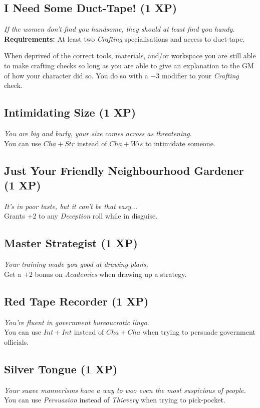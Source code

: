 \subsection*{I Need Some Duct-Tape! (1 XP)}
\textit{If the women don't find you handsome, they should at least find you handy.}\\
\textbf{Requirements:} At least two \textit{Crafting} specialisations and access to duct-tape.

When deprived of the correct tools, materials, and/or workspace you are still able to make crafting checks so long as you are able to give an explanation to the GM of how your character did so.
You do so with a $-3$ modifier to your \textit{Crafting} check.

\subsection*{Intimidating Size (1 XP)}
\textit{You are big and burly, your size comes across as threatening.}\\
You can use $Cha + Str$ instead of $Cha + Wis$ to intimidate someone.

\subsection*{Just Your Friendly Neighbourhood Gardener (1 XP)}
\textit{It's in poor taste, but it can't be that easy...}\\
Grants +2 to any \textit{Deception} roll while in disguise.

\subsection*{Master Strategist (1 XP)}
\textit{Your training made you good at drawing plans.}\\
Get a $+2$ bonus on \textit{Academics} when drawing up a strategy.

\subsection*{Red Tape Recorder (1 XP)}
\textit{You're fluent in government bureaucratic lingo.}\\ 
You can use $Int + Int$ instead of $Cha + Cha$ when trying to persuade government officials.

\subsection*{Silver Tongue (1 XP)}
\textit{Your suave mannerisms have a way to woo even the most suspicious of people.}\\
You can use \textit{Persuasion} instead of \textit{Thievery} when trying to pick-pocket.

